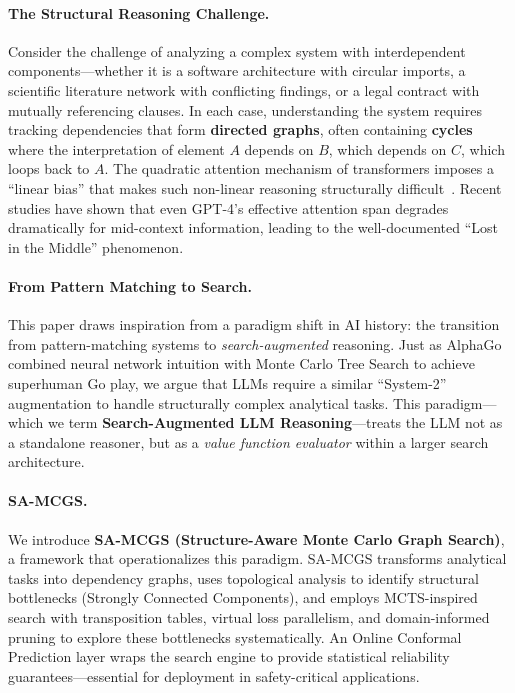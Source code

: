 \documentclass{article}
\begin{document}
\paragraph{The Structural Reasoning Challenge.}
Consider the challenge of analyzing a complex system with interdependent components---whether it is a software architecture with circular imports, a scientific literature network with conflicting findings, or a legal contract with mutually referencing clauses. In each case, understanding the system requires tracking dependencies that form \textbf{directed graphs}, often containing \textbf{cycles} where the interpretation of element $A$ depends on $B$, which depends on $C$, which loops back to $A$. The quadratic attention mechanism of transformers imposes a ``linear bias'' that makes such non-linear reasoning structurally difficult~\cite{lostinthemiddle}. Recent studies have shown that even GPT-4's effective attention span degrades dramatically for mid-context information, leading to the well-documented ``Lost in the Middle'' phenomenon.

\paragraph{From Pattern Matching to Search.}
This paper draws inspiration from a paradigm shift in AI history: the transition from pattern-matching systems to \emph{search-augmented} reasoning. Just as AlphaGo~\cite{mcts} combined neural network intuition with Monte Carlo Tree Search to achieve superhuman Go play, we argue that LLMs require a similar ``System-2'' augmentation to handle structurally complex analytical tasks. This paradigm---which we term \textbf{Search-Augmented LLM Reasoning}---treats the LLM not as a standalone reasoner, but as a \emph{value function evaluator} within a larger search architecture.

\paragraph{SA-MCGS.}
We introduce \textbf{SA-MCGS (Structure-Aware Monte Carlo Graph Search)}, a framework that operationalizes this paradigm. SA-MCGS transforms analytical tasks into dependency graphs, uses topological analysis to identify structural bottlenecks (Strongly Connected Components), and employs MCTS-inspired search with transposition tables, virtual loss parallelism, and domain-informed pruning to explore these bottlenecks systematically. An Online Conformal Prediction layer wraps the search engine to provide statistical reliability guarantees---essential for deployment in safety-critical applications.
\end{document}
